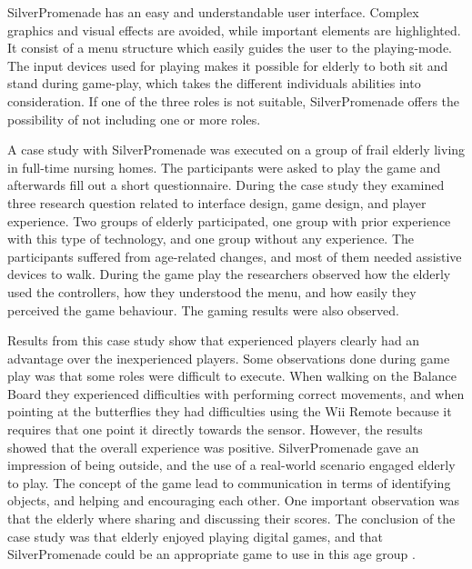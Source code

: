 SilverPromenade has an easy and understandable user interface. Complex graphics and visual effects are avoided, while important elements are highlighted. It consist of a menu structure which easily guides the user to the playing-mode. The input devices used for playing makes it possible for elderly to both sit and stand during game-play, which takes the different individuals abilities into consideration.  If one of the three roles is not suitable, SilverPromenade offers the possibility of not including one or more roles.

A case study with SilverPromenade was executed on a group of frail elderly living in full-time nursing homes. The participants were asked to play the game and afterwards fill out a short questionnaire. During the case study they examined three research question related to interface design, game design, and player experience. Two groups of elderly participated, one group with prior experience with this type of technology, and one group without any experience. The participants suffered from age-related changes, and most of them needed assistive devices to walk. During the game play the researchers observed how the elderly used the controllers, how they understood the menu, and how easily they perceived the game behaviour. The gaming results were also observed.

Results from this case study show that experienced players clearly had an advantage over the inexperienced players. Some observations done during game play was that some roles were difficult to execute. When walking on the Balance Board they experienced difficulties with performing correct movements, and when pointing at the butterflies they had difficulties using the Wii Remote because it requires that one point it directly towards the sensor. However, the results showed that the overall experience was positive. SilverPromenade gave an impression of being outside, and the use of a real-world scenario engaged elderly to play. The concept of the game lead to communication in terms of identifying objects, and helping and encouraging each other. One important observation was that the elderly where sharing and discussing their scores. The conclusion of the case study was that elderly enjoyed playing digital games, and that SilverPromenade could be an appropriate game to use in this age group \cite{gerling2}.

